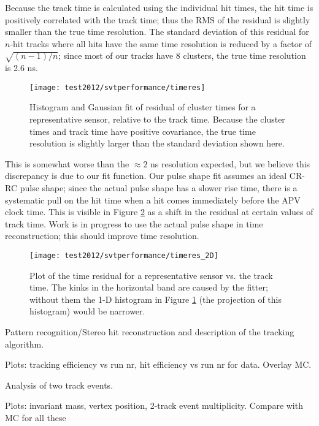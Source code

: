 Because the track time is calculated using the individual hit times, the hit time is positively correlated with the track time; thus the RMS of the residual is slightly smaller than the true time resolution.
The standard deviation of this residual for $n$-hit tracks where all hits have the same time resolution is reduced by a factor of $\sqrt{(n-1)/n}$; since most of our tracks have 8 clusters, the true time resolution is 2.6 ns. 

\begin{figure}[ht]
	\texttt{[image: test2012/svtperformance/timeres]}
	\caption{\small{Histogram and Gaussian fit of residual of cluster times for a representative sensor, relative to the track time. Because the cluster times and track time have positive covariance, the true time resolution is slightly larger than the standard deviation shown here.} }
	\label{fig:timeres}
\end{figure}


This is somewhat worse than the $\approx 2$ ns resolution expected, but we believe this discrepancy is due to our fit function. Our pulse shape fit assumes an ideal CR-RC pulse shape; since the actual pulse shape has a slower rise time, there is a systematic pull on the hit time when a hit comes immediately before the APV clock time. 
This is visible in Figure \ref{fig:timeres_2D} as a shift in the residual at certain values of track time.
Work is in progress to use the actual pulse shape in time reconstruction; this should improve time resolution.

\begin{figure}[ht]
	\texttt{[image: test2012/svtperformance/timeres\_2D]}
	\caption{\small{Plot of the time residual for a representative sensor vs. the track time. 
		The kinks in the horizontal band are caused by the fitter; without them the 1-D histogram in Figure \ref{fig:timeres} (the projection of this histogram) would be narrower.} }
	\label{fig:timeres_2D}
\end{figure}

\vspace{1cm}{\bf Tracking algorithms [Matt/Omar]}


Pattern recognition/Stereo hit reconstruction and description of the tracking algorithm. 

Plots: tracking efficiency vs run nr, hit efficiency vs run nr for data. Overlay MC.

\vspace{1cm}{\bf Tracking algorithms [Matt]}


Analysis of two track events. 

Plots: invariant mass, vertex position, 2-track event multiplicity. Compare with MC for all these 
